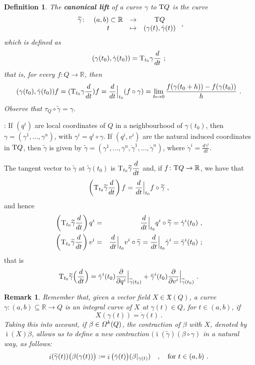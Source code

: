 \documentclass[12pt]{report}
\newtheorem{definition}[teor]{Definition}
\newtheorem{remark}[teor]{Remark}
\def\beq{\begin{equation}}
\def\eeq{\end{equation}}
\def\dst{\displaystyle}
\def\derpar#1#2{\frac{\partial{#1}}{\partial{#2}}}
\def\vf{\mathfrak X}
\def\df{{\mit\Omega}}
\def\Real{\mathbb{R}}
\def\Tan{{\rm T}}
\def\inn{\mathop{i}\nolimits}
\begin{document}
\begin{appendix}
\begin{definition}
\label{canlifcurv}
The \textbf{canonical lift} of a curve $\gamma$ to $\Tan Q$ is the curve
$$
\begin{array}{cccc}
\widetilde  \gamma \colon &(a,b)\subset\Real&\to&\Tan Q
\\
&t&\mapsto&(\gamma (t),\dot\gamma(t))
\end{array}  \ ,
$$
which is defined as
$$
(\gamma (t_0),\dot\gamma (t_0))=\Tan_{t_0}\gamma\frac{d}{d t} \ ;
$$
that is, for every $f\colon Q \to \Real$, then
$$
(\gamma (t_0),\dot\gamma (t_0))f=
(\Tan_{t_0}\gamma\frac{d}{d t})f=
\frac{d}{d t}\Big\vert_{t_0}(f\circ\gamma )
=\lim_{h\mapsto 0}\frac{f(\gamma (t_0+h))-f(\gamma (t_0))}{h} \ .
$$
Observe that $\tau_Q\circ\widetilde  \gamma=\gamma$.
\end{definition}

:
If $(q^i)$ are local coordinates of $Q$ in a neighbourhood of
$\gamma (t_0)$, then $\gamma =(\gamma^1,\ldots ,\gamma^n)$,
with $\gamma^i=q^i\circ\gamma$.
If $(q^i,v^i)$ are the natural induced coordinates in $\Tan Q$,
then $\widetilde  \gamma$ is given by
$\widetilde  \gamma =(\gamma^1,\ldots ,\gamma^n,\dot\gamma^1,\ldots ,\dot\gamma^n)$,
where \(\dst\dot\gamma^i=\frac{d\gamma^i}{d t}\).

The tangent vector to $\widetilde  \gamma$ at $\widetilde  \gamma (t_0)$
is \(\dst \Tan_{t_0}\widetilde  \gamma\frac{d}{d t}\)
and, if $f\colon\Tan Q\to \Real$, we have that
$$
\left( \Tan_{t_0}\widetilde  \gamma\frac{d}{d t}\right) f=
\frac{d}{d t}\Big\vert_{t_0}f\circ\widetilde  \gamma \ ,
$$
and hence
\begin{eqnarray*}
\left(\Tan_{t_0}\widetilde  \gamma\frac{d}{d t}\right) q^i&=&
\frac{d}{d t}\Big\vert_{t_0}q^i\circ\widetilde  \gamma=\dot\gamma^i(t_0) \ ,
\\
\left(\Tan_{t_0}\widetilde  \gamma\frac{d}{d t}\right) v^i&=&
\frac{d}{d t}\Big\vert_{t_0}v^i\circ\widetilde  \gamma=
\frac{d}{d t}\Big\vert_{t_0}\dot\gamma^i=\ddot\gamma^i(t_0) \ ;
\end{eqnarray*}
that is
$$
\Tan_{t_0}\widetilde\gamma\Big(\frac{d}{d t}\Big)=
\dot\gamma^i(t_0)\derpar{}{q^i}\Big\vert_{\widetilde  \gamma (t_0)}
+\ddot\gamma^i(t_0)\derpar{}{v^i}\Big\vert_{\widetilde  \gamma (t_0)} \ .
$$

\begin{remark}{\rm
\label{intcurve}
Remember that, given a vector field $X\in\vf(Q)$,
a curve $\gamma\colon (a,b)\subseteq\Real\to Q$
is an {\sl integral curve} of $X$ at $\gamma(t)\in Q$, for $t\in (a,b)$, if
$$
X(\gamma(t))=\dot\gamma(t)\ .
$$
Taking this into account, if $\beta\in\df^k(Q)$,
the contraction of $\beta$ with $X$, denoted by $\inn(X)\beta$, allows us to define a new contraction
$\big(\inn(\widetilde \gamma)(\beta\circ\gamma)$  in a natural way, as follows:
\beq
\inn(\widetilde \gamma(t))\big(\beta(\gamma(t))\big):=
\inn\big(\dot\gamma(t)\big)(\beta\vert_{\gamma(t)}) \quad, \quad \mbox{\rm for $t\in (a,b)$} \ .
\label{contr2}
\eeq
}\end{remark}



\end{appendix}
\end{document}
